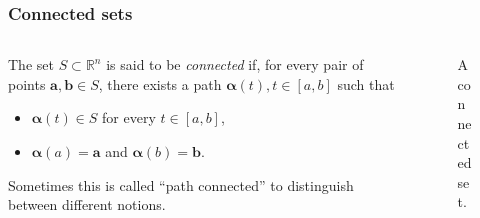 \documentclass[aspectratio=169,handout]{beamer}
\newcommand{\bR}{\mathbb{R}} %
\renewcommand{\aa}{\mathbf{a}}
\newcommand{\bb}{\mathbf{b}}
\newcommand{\aalpha}{\boldsymbol{\alpha}}
\begin{document}
\begin{frame}
    \frametitle{Connected sets}

    
    \begin{columns}
        \begin{column}{.5\textwidth}
            \begin{definition}[connected]
                The set \(S\subset \bR^n\) is said to be \emph{connected} if, for every pair of points \(\aa,\bb\in S\), there exists a path \(\aalpha(t), t\in[a,b]\) such that 
                \begin{itemize}
                    \item \(\aalpha(t)\in S\) for every \( t\in[a,b]\),
                    \item \(\aalpha(a)=\aa\) and \(\aalpha(b)=\bb\).
                \end{itemize}
            \end{definition}
        
             Sometimes this is called ``path connected'' to distinguish between different notions.
        \end{column}

        \begin{column}{.5\textwidth}
            \begin{figure}
                \caption{A connected set.}
            \end{figure}
        \end{column}
    \end{columns}
    

\end{frame}
\end{document}

